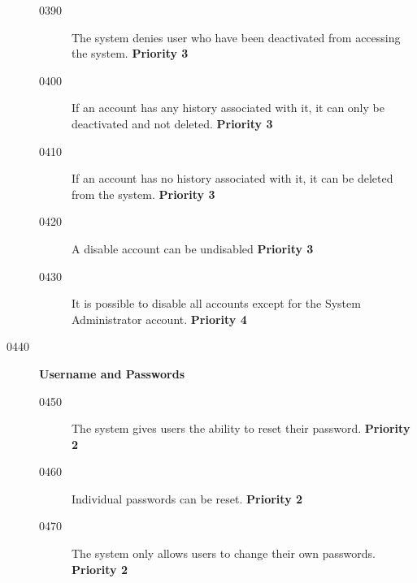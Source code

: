 \documentclass{article}
\begin{document}
\begin{description}
    \begin{description}

    \item[0390] The system denies user who have been deactivated from
      accessing the system. \textbf{Priority 3}
    \item[0400] If an account has any history associated with it, it can only
      be deactivated and not deleted. \textbf{Priority 3}
    \item[0410] If an account has no history associated with it, it can be
      deleted from the system. \textbf{Priority 3}
    \item[0420] A disable account can be undisabled \textbf{Priority 3}
    \item[0430] It is possible to disable all accounts except for the System
      Administrator account. \textbf{Priority 4}
    \end{description}

  
\item[0440] \textbf{Username and Passwords}

  \begin{description}

  \item[0450] The system gives users the ability to reset their password. \textbf{Priority 2}
  \item[0460] Individual passwords can be reset. \textbf{Priority 2}
  \item[0470] The system only allows users to change their own
  passwords. \textbf{Priority 2}

  \end{description}

\end{description}
\end{document}
